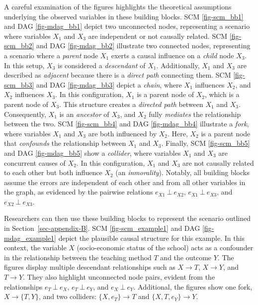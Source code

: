 \documentclass[
  authoryear,
  review,
  1p]{elsarticle}
\begin{document}
A careful examination of the figures highlights the theoretical
assumptions underlying the observed variables in these building blocks.
SCM \ref{fig-scm_bb1} and DAG \ref{fig-mdag_bb1} depict two unconnected
nodes, representing a scenario where variables \(X_{1}\) and \(X_{3}\)
are independent or not causally related. SCM \ref{fig-scm_bb2} and DAG
\ref{fig-mdag_bb2} illustrate two connected nodes, representing a
scenario where a \emph{parent} node \(X_{1}\) exerts a causal influence
on a \emph{child} node \(X_{3}\). In this setup, \(X_{3}\) is considered
a \emph{descendant} of \(X_{1}\). Additionally, \(X_{1}\) and \(X_{3}\)
are described as \emph{adjacent} because there is a \emph{direct path}
connecting them. SCM \ref{fig-scm_bb3} and DAG \ref{fig-mdag_bb3} depict
a \emph{chain}, where \(X_{1}\) influences \(X_{2}\), and \(X_{2}\)
influences \(X_{3}\). In this configuration, \(X_{1}\) is a parent node
of \(X_{2}\), which is a parent node of \(X_{3}\). This structure
creates a \emph{directed path} between \(X_{1}\) and \(X_{3}\).
Consequently, \(X_{1}\) is an \emph{ancestor} of \(X_{3}\), and
\(X_{2}\) fully \emph{mediates} the relationship between the two. SCM
\ref{fig-scm_bb4} and DAG \ref{fig-mdag_bb4} illustrate a \emph{fork},
where variables \(X_{1}\) and \(X_{3}\) are both influenced by
\(X_{2}\). Here, \(X_{2}\) is a parent node that \emph{confounds} the
relationship between \(X_{1}\) and \(X_{3}\). Finally, SCM
\ref{fig-scm_bb5} and DAG \ref{fig-mdag_bb5} show a \emph{collider},
where variables \(X_{1}\) and \(X_{3}\) are concurrent causes of
\(X_{2}\). In this configuration, \(X_{1}\) and \(X_{3}\) are not
causally related to each other but both influence \(X_{2}\) (an
\emph{inmorality}). Notably, all building blocks assume the errors are
independent of each other and from all other variables in the graph, as
evidenced by the pairwise relations \(e_{X1} \:\bot\:e_{X2}\),
\(e_{X1} \:\bot\:e_{X3}\), and \(e_{X2} \:\bot\:e_{X3}\).

Researchers can then use these building blocks to represent the scenario
outlined in Section~\ref{sec-appendix-B}. SCM \ref{fig-scm_example1} and
DAG \ref{fig-mdag_example1} depict the plausible causal structure for
this example. In this context, the variable \(X\) (socio-economic status
of the school) acts as a confounder in the relationship between the
teaching method \(T\) and the outcome \(Y\). The figures display
multiple descendant relationships such as \(X \rightarrow T\),
\(X \rightarrow Y\), and \(T \rightarrow Y\). They also highlight
unconnected node pairs, evident from the relationships
\(e_{T} \:\bot\:e_{X}\), \(e_{T} \:\bot\:e_{Y}\), and
\(e_{X} \:\bot\:e_{Y}\). Additional, the figures show one fork,
\(X \rightarrow \{T, Y\}\), and two colliders:
\(\{X, e_{T}\} \rightarrow T\) and \(\{X, T, e_{Y}\} \rightarrow Y\).
\end{document}
